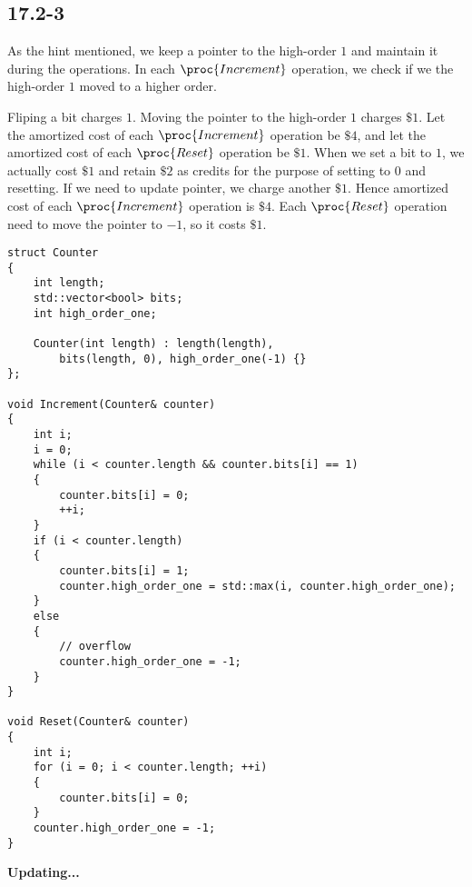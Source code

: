 \subsection*{17.2-3}

As the hint mentioned,
we keep a pointer to the high-order $1$
and maintain it during the operations.
In each $\proc{Increment}$ operation,
we check if we the high-order $1$ moved to a higher order.

Fliping a bit charges $1$.
Moving the pointer to the high-order $1$ charges $\$1$.
Let the amortized cost of each $\proc{Increment}$ operation be $\$4$,
and let the amortized cost of each $\proc{Reset}$ operation be $\$1$.
When we set a bit to $1$, we actually cost $\$1$ and retain $\$2$ as credits
for the purpose of setting to $0$ and resetting.
If we need to update pointer, we charge another $\$1$.
Hence amortized cost of each $\proc{Increment}$ operation is $\$4$.
Each $\proc{Reset}$ operation need to move the pointer to $-1$,
so it costs $\$1$.

\begin{verbatim}
struct Counter
{
    int length;
    std::vector<bool> bits;
    int high_order_one;

    Counter(int length) : length(length), 
        bits(length, 0), high_order_one(-1) {}
};

void Increment(Counter& counter)
{
    int i;
    i = 0;
    while (i < counter.length && counter.bits[i] == 1)
    {
        counter.bits[i] = 0;
        ++i;
    }
    if (i < counter.length)
    {
        counter.bits[i] = 1;
        counter.high_order_one = std::max(i, counter.high_order_one);
    }
    else
    {
        // overflow
        counter.high_order_one = -1;
    }
}

void Reset(Counter& counter)
{
    int i;
    for (i = 0; i < counter.length; ++i)
    {
        counter.bits[i] = 0;
    }
    counter.high_order_one = -1;
}
\end{verbatim}
    


\centerline{\textbf{Updating...}}

